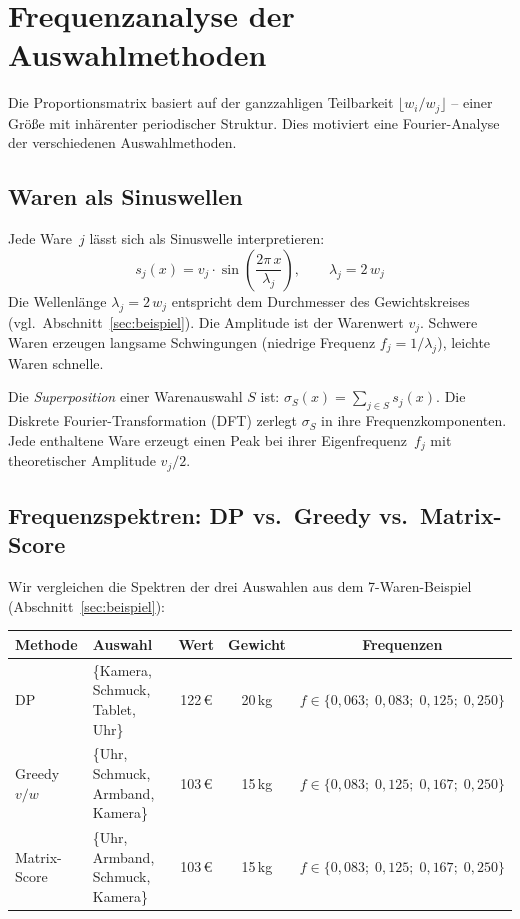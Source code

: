 \documentclass[a4paper,11pt]{article}
\begin{document}
\section{Frequenzanalyse der Auswahlmethoden}
\label{sec:fourier}

Die Proportionsmatrix basiert auf der ganzzahligen Teilbarkeit
$\lfloor w_i/w_j \rfloor$ -- einer Größe mit inhärenter
periodischer Struktur. Dies motiviert eine Fourier-Analyse
der verschiedenen Auswahlmethoden.

\subsection{Waren als Sinuswellen}

Jede Ware~$j$ lässt sich als Sinuswelle interpretieren:
\[
s_j(x) = v_j \cdot \sin\!\left(\frac{2\pi\, x}{\lambda_j}\right),
\qquad \lambda_j = 2\,w_j
\]
Die Wellenlänge $\lambda_j = 2\,w_j$ entspricht dem Durchmesser
des Gewichtskreises (vgl.\ Abschnitt~\ref{sec:beispiel}).
Die Amplitude ist der Warenwert $v_j$.
Schwere Waren erzeugen langsame Schwingungen (niedrige Frequenz
$f_j = 1/\lambda_j$), leichte Waren schnelle.

\medskip
\noindent
Die \emph{Superposition} einer Warenauswahl $S$ ist:
$\sigma_S(x) = \sum_{j \in S} s_j(x)$.
Die Diskrete Fourier-Transformation (DFT) zerlegt $\sigma_S$
in ihre Frequenzkomponenten. Jede enthaltene Ware erzeugt
einen Peak bei ihrer Eigenfrequenz~$f_j$ mit theoretischer
Amplitude $v_j/2$.

\subsection{Frequenzspektren: DP vs.\ Greedy vs.\ Matrix-Score}

Wir vergleichen die Spektren der drei Auswahlen aus dem
7-Waren-Beispiel (Abschnitt~\ref{sec:beispiel}):

\begin{center}
\small
\renewcommand{\arraystretch}{1.15}
\begin{tabular}{llccc}
\toprule
Methode & Auswahl & Wert & Gewicht & Frequenzen \\
\midrule
DP
  & \{Kamera, Schmuck, Tablet, Uhr\} & 122\,\euro & 20\,kg
  & $f \in \{0{,}063;\;0{,}083;\;0{,}125;\;0{,}250\}$ \\
Greedy $v/w$
  & \{Uhr, Schmuck, Armband, Kamera\} & 103\,\euro & 15\,kg
  & $f \in \{0{,}083;\;0{,}125;\;0{,}167;\;0{,}250\}$ \\
Matrix-Score
  & \{Uhr, Armband, Schmuck, Kamera\} & 103\,\euro & 15\,kg
  & $f \in \{0{,}083;\;0{,}125;\;0{,}167;\;0{,}250\}$ \\
\bottomrule
\end{tabular}
\end{center}
\end{document}
